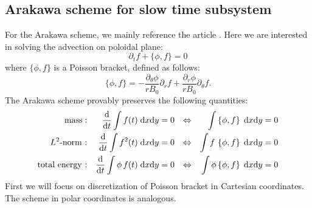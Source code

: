 \subsection{Arakawa scheme for slow time subsystem}

For the Arakawa scheme, we mainly reference the article \cite{Arakawa_1966}. Here we are interested in solving the advection on poloidal plane:
\begin{equation}
 \partial_t f + \{\phi, f\} = 0
\end{equation}
where $\{\phi,f\}$ is a Poisson bracket, defined as follows:
\begin{equation}
 \{\phi,f\}=-\frac{\partial_\theta\phi}{rB_0}\partial_r f + \frac{\partial_r\phi}{rB_0}\partial_\theta f.
\end{equation}
The Arakawa scheme provably preserves the following quantities:
	\begin{align*}
		\text{mass} : && \frac{\text{d}}{\text{d} t} \int f(t) \;\text{d} x \text{d} y & = 0 & \Leftrightarrow && \int\left\{ \phi, f \right\} \;\text{d} x \text{d} y & = 0 \\
		L^2\text{-norm :} && \frac{\text{d}}{\text{d} t} \int f^2(t) \;\text{d} x \text{d} y & = 0 & \Leftrightarrow && \int f \, \left\{ \phi, f \right\} \;\text{d} x \text{d} y & = 0 \\
		\text{total energy :} && \frac{\text{d}}{\text{d} t} \int \phi \, f(t) \;\text{d} x \text{d} y & = 0 & \Leftrightarrow && \int \phi \left\{ \phi, f \right\} \;\text{d} x \text{d} y & = 0
	\end{align*}
First we will focus on discretization of Poisson bracket in Cartesian coordinates. The scheme in polar coordinates is analogous.\\

